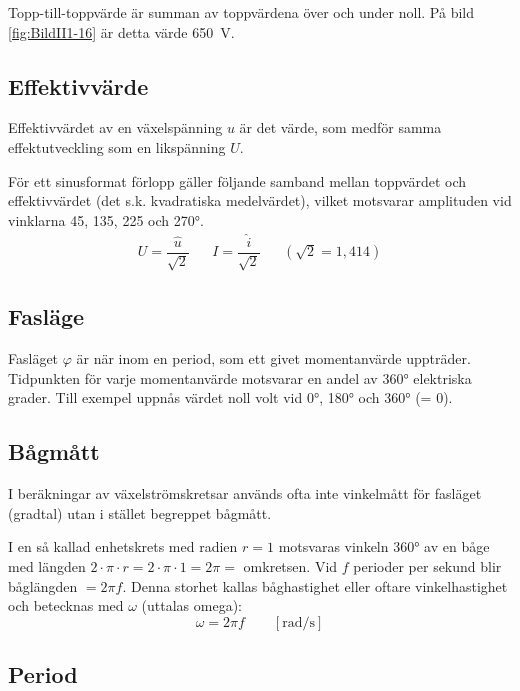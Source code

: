 Topp-till-toppvärde är summan av toppvärdena över och under noll.
På bild \ref{fig:BildII1-16} är detta värde \SI{650}{\volt}.

\subsection{Effektivvärde}
\label{effektivvärde}

Effektivvärdet av en växelspänning \(u\) är det värde, som medför samma
effektutveckling som en likspänning \(U\).

För ett sinusformat förlopp gäller följande samband mellan toppvärdet och
effektivvärdet (det s.k. kvadratiska medelvärdet), vilket motsvarar amplituden
vid vinklarna 45, 135, 225 och \ang{270}.
\[
\begin{array}{lllll}
U=\dfrac{\hat{u}}{\sqrt{2}} & & I=\dfrac{\hat{i}}{\sqrt{2}} & & (\sqrt{2} = 1,414)
\end{array}
\]
\subsection{Fasläge}

Fasläget \(\varphi\) är när inom en period, som ett givet momentanvärde
uppträder.
Tidpunkten för varje momentanvärde motsvarar en andel av \ang{360} elektriska
grader.
Till exempel uppnås värdet noll volt vid \ang{0}, \ang{180} och \ang{360} (= 0\degree).

\subsection{Bågmått}

I beräkningar av växelströmskretsar används ofta inte vinkelmått för fasläget
(gradtal) utan i stället begreppet bågmått.

I en så kallad enhetskrets med radien \(r = 1\) motsvaras vinkeln \ang{360} av
en båge med längden \(2 \cdot \pi \cdot r= 2 \cdot \pi \cdot 1 = 2 \pi =\)
omkretsen.
Vid \(f\) perioder per sekund blir båglängden \(= 2\pi f\).
Denna storhet kallas båghastighet eller oftare vinkelhastighet och betecknas
med \(\omega\) (uttalas omega):
\[\omega= 2\pi f\qquad [\text{rad/s}]\]
\subsection{Period}
\label{period}

